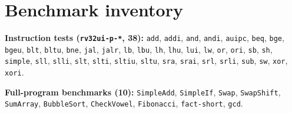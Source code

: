 \documentclass[11pt,a4paper]{article}
\newcommand{\code}[1]{\texttt{#1}}          %
\newcommand{\sig}[1]{\texttt{#1}}
\begin{document}
\section{Benchmark inventory}
\label{app:bench}
\textbf{Instruction tests (\code{rv32ui-p-*}, 38):} \sig{add}, \sig{addi}, \sig{and},
\sig{andi}, \sig{auipc}, \sig{beq}, \sig{bge}, \sig{bgeu}, \sig{blt}, \sig{bltu},
\sig{bne}, \sig{jal}, \sig{jalr}, \sig{lb}, \sig{lbu}, \sig{lh}, \sig{lhu}, \sig{lui},
\sig{lw}, \sig{or}, \sig{ori}, \sig{sb}, \sig{sh}, \sig{simple}, \sig{sll}, \sig{slli},
\sig{slt}, \sig{slti}, \sig{sltiu}, \sig{sltu}, \sig{sra}, \sig{srai}, \sig{srl},
\sig{srli}, \sig{sub}, \sig{sw}, \sig{xor}, \sig{xori}.

\medskip
\noindent\textbf{Full-program benchmarks (10):} \code{SimpleAdd}, \code{SimpleIf},
\code{Swap}, \code{SwapShift}, \code{SumArray}, \code{BubbleSort}, \code{CheckVowel},
\code{Fibonacci}, \code{fact-short}, \code{gcd}.
\end{document}
